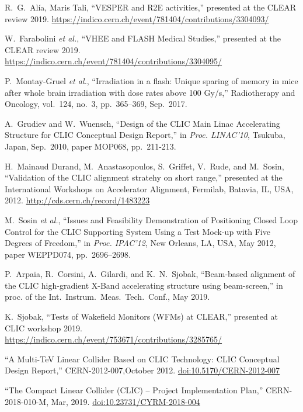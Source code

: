 \documentclass[a4paper,
               keeplastbox,   %
               ]{jacow}
\begin{document}
\begin{thebibliography}{99}
 R.\ G.\ Alía, Maris Tali, “VESPER and R2E activities,” presented at the CLEAR review 2019. \url{https://indico.cern.ch/event/781404/contributions/3304093/}

 W.\ Farabolini \emph{et al.}, “VHEE and FLASH Medical Studies,” presented at the CLEAR review 2019. \url{https://indico.cern.ch/event/781404/contributions/3304095/}

 P.\ Montay-Gruel \emph{et al.}, “Irradiation in a flash: Unique sparing of memory in mice after whole brain irradiation with dose rates above 100 Gy/s,” Radiotherapy and Oncology, vol.\ 124, no.\ 3, pp.\ 365--369, Sep.\ 2017.

 A.\ Grudiev and W.\ Wuensch, “Design of the CLIC Main Linac Accelerating Structure for CLIC Conceptual Design Report,” in \emph{Proc. LINAC’10}, Tsukuba, Japan, Sep.\ 2010, paper MOP068, pp.\ 211-213.

 H.\ Mainaud Durand, M.\ Anastasopoulos, S.\ Griffet, V.\ Rude, and M.\ Sosin, “Validation of the CLIC alignment stratehy on short range,” presented at the International Workshops on Accelerator Alignment, Fermilab, Batavia, IL, USA, 2012. \url{http://cds.cern.ch/record/1483223}

 M.\ Sosin \emph{et al.}, “Issues and Feasibility Demonstration of Positioning Closed Loop Control for the CLIC Supporting System Using a Test Mock-up with Five Degrees of Freedom,” in \emph{Proc. IPAC’12}, New Orleans, LA, USA, May 2012, paper WEPPD074, pp.\ 2696--2698.

 P.\ Arpaia, R.\ Corsini, A.\ Gilardi, and K.\ N.\ Sjobak, “Beam-based alignment of the CLIC high-gradient X-Band accelerating structure using beam-screen,” in proc. of the Int.\ Instrum.\ Meas.\ Tech.\ Conf., May 2019.

 K.\ Sjobak, “Tests of Wakefield Monitors (WFMs) at CLEAR,” presented at CLIC workshop 2019. \url{https://indico.cern.ch/event/753671/contributions/3285765/}

 “A Multi-TeV Linear Collider Based on CLIC Technology: CLIC Conceptual Design Report,” CERN-2012-007,October 2012. \url{doi:10.5170/CERN-2012-007}

 “The Compact Linear Collider (CLIC) – Project Implementation Plan,” CERN-2018-010-M, Mar, 2019. \url{doi:10.23731/CYRM-2018-004}


\end{thebibliography}
\end{document}
